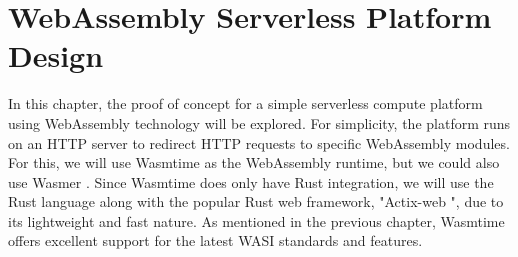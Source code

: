 \chapter{WebAssembly Serverless Platform Design}
\label{chap:poc}

In this chapter, the proof of concept for a simple \gls{serverless} compute platform using \gls{WebAssembly} technology will be explored. For simplicity, the platform runs on an HTTP server to redirect HTTP requests to specific WebAssembly modules. For this, we will use Wasmtime \cite{bytecodealliance_2022_wasmtime} as the WebAssembly runtime, but we could also use Wasmer \cite{wasmerinc_2023_wasmer}. Since Wasmtime does only have Rust integration, we will use the Rust language along with the popular Rust web framework, "Actix-web \cite{actixteam_actix}", due to its lightweight and fast nature. As mentioned in the previous chapter, Wasmtime offers excellent support for the latest WASI standards and features. 


